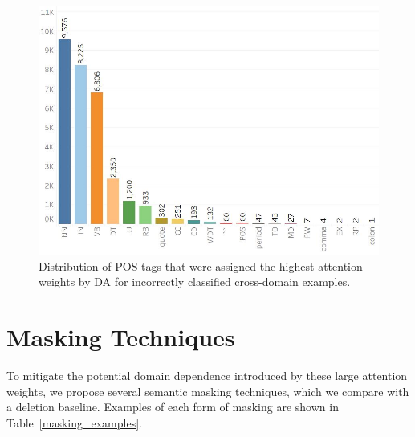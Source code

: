 \begin{figure}
 \includegraphics[width=0.95\linewidth]{mainmatter/emnlp2019_delex/histogram_2.jpeg}
    \vspace{-3mm}
    \caption{ Distribution of POS tags that were assigned the highest attention weights by DA for incorrectly classified cross-domain examples.}
  \label{fig:attention}
\vspace{-6mm}
\end{figure}



\section{Masking Techniques}\label{masking_techniques}

To mitigate the potential domain dependence introduced by these large attention weights, we propose several semantic masking techniques, which we compare with a deletion baseline.  Examples of each form of masking are shown in Table~\ref{masking_examples}.


